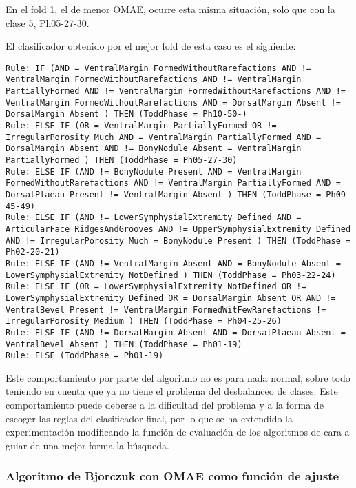 En el fold 1, el de menor OMAE, ocurre esta misma situación, solo que con la clase 5, Ph05-27-30.


El clasificador obtenido por el mejor fold de esta caso es el siguiente:

\begin{lstlisting}
Rule: IF (AND = VentralMargin FormedWithoutRarefactions AND != VentralMargin FormedWithoutRarefactions AND != VentralMargin PartiallyFormed AND != VentralMargin FormedWithoutRarefactions AND != VentralMargin FormedWithoutRarefactions AND = DorsalMargin Absent != DorsalMargin Absent ) THEN (ToddPhase = Ph10-50-)
Rule: ELSE IF (OR = VentralMargin PartiallyFormed OR != IrregularPorosity Much AND = VentralMargin PartiallyFormed AND = DorsalMargin Absent AND != BonyNodule Absent = VentralMargin PartiallyFormed ) THEN (ToddPhase = Ph05-27-30)
Rule: ELSE IF (AND != BonyNodule Present AND = VentralMargin FormedWithoutRarefactions AND != VentralMargin PartiallyFormed AND = DorsalPlaeau Present != VentralMargin Absent ) THEN (ToddPhase = Ph09-45-49)
Rule: ELSE IF (AND != LowerSymphysialExtremity Defined AND = ArticularFace RidgesAndGrooves AND != UpperSymphysialExtremity Defined AND != IrregularPorosity Much = BonyNodule Present ) THEN (ToddPhase = Ph02-20-21)
Rule: ELSE IF (AND != VentralMargin Absent AND = BonyNodule Absent = LowerSymphysialExtremity NotDefined ) THEN (ToddPhase = Ph03-22-24)
Rule: ELSE IF (OR = LowerSymphysialExtremity NotDefined OR != LowerSymphysialExtremity Defined OR = DorsalMargin Absent OR AND != VentralBevel Present != VentralMargin FormedWitFewRarefactions != IrregularPorosity Medium ) THEN (ToddPhase = Ph04-25-26)
Rule: ELSE IF (AND != DorsalMargin Absent AND = DorsalPlaeau Absent = VentralBevel Absent ) THEN (ToddPhase = Ph01-19)
Rule: ELSE (ToddPhase = Ph01-19)
\end{lstlisting}



Este comportamiento por parte del algoritmo no es para nada normal, sobre todo teniendo en cuenta que ya no tiene el problema del desbalanceo de clases. Este comportamiento puede deberse a la dificultad del problema y a la forma de escoger las reglas del clasificador final, por lo que se ha extendido la experimentación modificando la función de evaluación de los algoritmos de cara a guiar de una mejor forma la búsqueda.

\subsubsection{Algoritmo de Bjorczuk con OMAE como función de ajuste}



